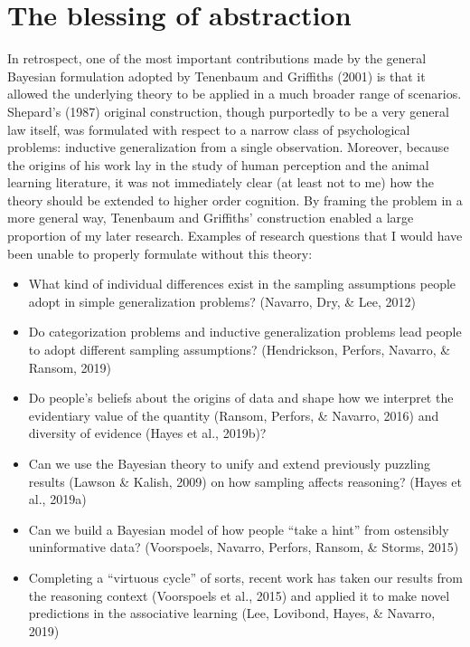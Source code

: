 \documentclass[english,doc]{apa6}
\providecommand{\tightlist}{%
  \setlength{\itemsep}{0pt}\setlength{\parskip}{0pt}}
\begin{document}
\hypertarget{the-blessing-of-abstraction}{%
\section{The blessing of abstraction}\label{the-blessing-of-abstraction}}

In retrospect, one of the most important contributions made by the general Bayesian formulation adopted by Tenenbaum and Griffiths (2001) is that it allowed the underlying theory to be applied in a much broader range of scenarios. Shepard's (1987) original construction, though purportedly to be a very general law itself, was formulated with respect to a narrow class of psychological problems: inductive generalization from a single observation. Moreover, because the origins of his work lay in the study of human perception and the animal learning literature, it was not immediately clear (at least not to me) how the theory should be extended to higher order cognition. By framing the problem in a more general way, Tenenbaum and Griffiths' construction enabled a large proportion of my later research. Examples of research questions that I would have been unable to properly formulate without this theory:

\begin{itemize}
\tightlist
\item
  What kind of individual differences exist in the sampling assumptions people adopt in simple generalization problems? (Navarro, Dry, \& Lee, 2012)
\item
  Do categorization problems and inductive generalization problems lead people to adopt different sampling assumptions? (Hendrickson, Perfors, Navarro, \& Ransom, 2019)
\item
  Do people's beliefs about the origins of data and shape how we interpret the evidentiary value of the quantity (Ransom, Perfors, \& Navarro, 2016) and diversity of evidence (Hayes et al., 2019b)?
\item
  Can we use the Bayesian theory to unify and extend previously puzzling results (Lawson \& Kalish, 2009) on how sampling affects reasoning? (Hayes et al., 2019a)
\item
  Can we build a Bayesian model of how people ``take a hint'' from ostensibly uninformative data? (Voorspoels, Navarro, Perfors, Ransom, \& Storms, 2015)
\item
  Completing a ``virtuous cycle'' of sorts, recent work has taken our results from the reasoning context (Voorspoels et al., 2015) and applied it to make novel predictions in the associative learning (Lee, Lovibond, Hayes, \& Navarro, 2019)
\end{itemize}
\end{document}
